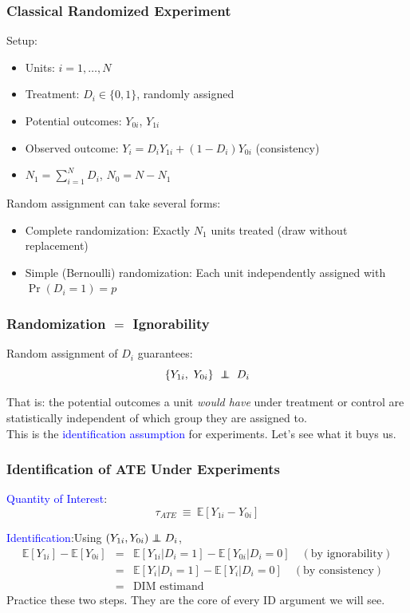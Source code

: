 \documentclass[xcolor=dvipsnames]{beamer}
\renewcommand\r{\right}
\renewcommand\l{\left}
\newcommand\makegaps{\addtolength{\itemsep}{.25\baselineskip}}
\newcommand\E{\mathbb{E}}
\newcommand\indep{\protect\mathpalette{\protect\independenT}{\perp}}
\def\independenT#1#2{\mathrel{\rlap{$#1#2$}\mkern2mu{#1#2}}}
\begin{document}
\begin{frame}
\frametitle{Classical Randomized Experiment}
\small
Setup:
\begin{itemize}
\item Units: $i = 1, \ldots, N$
\item Treatment: $D_i \in \{0,1\}$, randomly assigned
\item Potential outcomes: $Y_{0i}$, $Y_{1i}$
\item Observed outcome: $Y_i = D_i Y_{1i} + (1-D_i) Y_{0i}$ \quad (consistency)
\item $N_1 = \sum_{i=1}^N D_i$, \quad $N_0 = N - N_1$
\end{itemize}

\pause
\medskip
Random assignment can take several forms:
\footnotesize
\begin{itemize}
\makegaps
\item \alert{Complete randomization}: Exactly $N_1$ units treated (draw without replacement)
\item \alert{Simple (Bernoulli) randomization}: Each unit independently assigned with $\Pr(D_i=1)=p$
\end{itemize}
\end{frame}


\begin{frame}
  \frametitle{Randomization $=$ Ignorability}
  \small
Random assignment of $D_i$ guarantees:
$$ \l\{ Y_{1i}, \ Y_{0i}\r\} \ \indep \ D_i $$

\pause
\medskip
That is: the potential outcomes a unit \textit{would have} under treatment or control are statistically independent of which group they are assigned to.\\

\pause
\bigskip
This is the \textcolor{Blue}{identification assumption} for experiments.  Let's see what it buys us.
\end{frame}


\begin{frame}[t]
\frametitle{Identification of ATE Under Experiments}
\small
{} \textcolor{Blue}{Quantity of Interest}:
$$ \tau_{ATE} \ \equiv \ \E[Y_{1i} - Y_{0i}]$$

 \textcolor{Blue}{Identification}:\quad Using $(Y_{1i},Y_{0i}) \indep D_i$,\\
\footnotesize
{} \begin{eqnarray*}
\E[Y_{1i}] - \E[Y_{0i}] &=& \E[Y_{1i}|D_i=1] - \E[Y_{0i} | D_i=0] \quad (\text{by ignorability}) \\
&=& \E[Y_{i}|D_i=1] - \E[Y_{i} | D_i=0]  \quad (\text{by consistency})\\
&=& \text{DIM estimand}
\end{eqnarray*}
 \small Practice these two steps.  They are the core of every ID argument we will see.
\end{frame}
\end{document}
